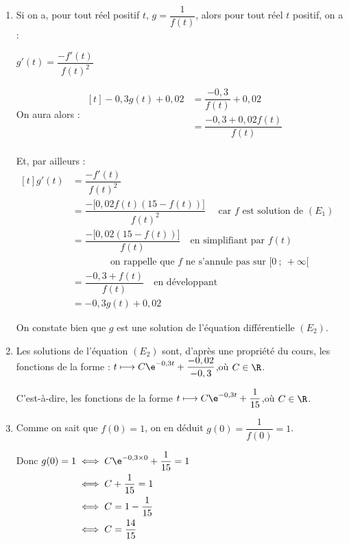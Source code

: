 \begin{enumerate}
	\item Si on a, pour tout réel positif $t$, \quad$g = \dfrac{1}{f(t)}$, alors pour tout réel $t$ positif, on a :

	$g'(t) = \dfrac{-f'(t)}{f(t)^2}$

	On aura alors : \quad
	$\begin{aligned}[t]
		-0,3g(t) + 0,02
		&= \dfrac{-0,3}{f(t)} + 0,02 \\
		&= \dfrac{-0,3 + 0,02f(t)}{f(t)}\\
	\end{aligned}$

	Et, par ailleurs : \quad
	$\begin{aligned}[t]
		g'(t)
		&= \dfrac{-f'(t)}{f(t)^2} \\
		&= \dfrac{-\big[0,02f(t)(15 - f(t))\big]}{f(t)^2}\quad \text{ car $f$ est solution de }(E_1)\\
		&= \dfrac{-\big[0,02(15 - f(t))\big]}{f(t)}\quad \text{en simplifiant par } f(t) \\
		&\qquad\qquad \text{on rappelle que $f$ ne s'annule pas sur $[0~;~ +\infty[$}\\
		&= \dfrac{-0,3 + f(t)}{f(t)}\quad \text{en développant}\\
		&=-0,3g(t) + 0,02
	\end{aligned}$

	On constate bien que $g$ est une solution de l'équation différentielle $(E_2)$.

	\item Les solutions de l'équation $(E_2)$ sont, d'après une propriété du cours, les fonctions de la forme :
	\quad
	$t \longmapsto C \e^{-0,3t} + \dfrac{-0,02}{-0,3}$,\quad où $C \in \R$.

	C'est-à-dire, les fonctions de la forme \quad
	$t \longmapsto C \e^{-0,3t} + \dfrac{1}{15}$,\quad où $C \in \R$.

	\item Comme on sait que $f(0) = 1$, on en déduit $g(0) = \dfrac{1}{f(0)} = 1$.

	Donc \quad
	$\begin{aligned}[t]
		g(0) = 1
		&\iff C \e^{-0,3\times 0} + \dfrac{1}{15} = 1\\
		&\iff C + \dfrac{1}{15} = 1\\
		&\iff C = 1 - \dfrac{1}{15}\\
		&\iff C = \dfrac{14}{15}\\
	\end{aligned}$


\end{enumerate}
